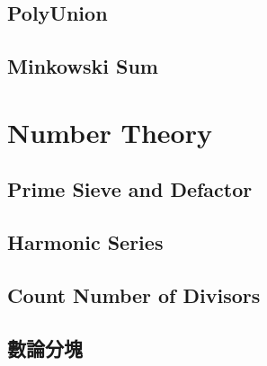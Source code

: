 \documentclass[a4paper,10pt,twocolumn,oneside]{article}
\begin{document}
% 

\subsection{PolyUnion}


% 

\subsection{Minkowski Sum}







\section{Number Theory}

%

\subsection{Prime Sieve and Defactor}


\subsection{Harmonic Series}


\subsection{Count Number of Divisors}


\subsection{數論分塊}

\end{document}
